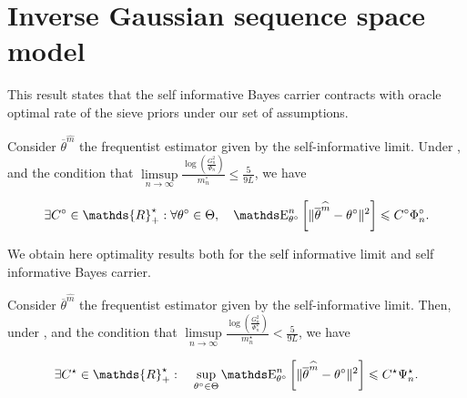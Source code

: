 \section{Inverse Gaussian sequence space model}\label{FREQ_IGSSM_KNOWN}

This result states that the self informative Bayes carrier contracts with oracle optimal rate of the sieve priors under our set of assumptions.

\begin{thm}\label{THM_FREQ_IGSSM_KNOWN_IID_ORACLE_NP}
Consider $\overline{\theta}^{\widehat{m}}$ the frequentist estimator given by the self-informative limit.
Under ,  and the condition that $\limsup\limits_{n \rightarrow \infty}\frac{\log\left(\frac{G_{n}^{2}}{\Phi_{n}^{\circ}}\right)}{m_{n}^{\circ}} \leq \frac{5}{9 L}$, we have

\[\exists C^{\circ} \in \mathds{R}_{+}^{\star} : \forall \theta^{\circ} \in \Theta, \quad \E_{\theta^{\circ}}^{n}\left[\Vert \overline{\theta}^{\widehat{m}} - \theta^{\circ} \Vert^{2}\right] \leq C^{\circ} \Phi_{n}^{\circ}.\]
\end{thm}

We obtain here optimality results both for the self informative limit and self informative Bayes carrier.

\begin{thm}\label{THM_FREQ_IGSSM_KNOWN_IID_MINIMAX_NP}
Consider $\overline{\theta}^{\widehat{m}}$ the frequentist estimator given by the self-informative limit.
Then, under ,  and the condition that $\limsup\limits_{n \rightarrow \infty}\frac{\log\left(\frac{G_{n}^{2}}{\Phi_{n}^{\star}}\right)}{m_{n}^{\star}} < \frac{5}{9 L}$, we have

\[\exists C^{\star} \in \mathds{R}_{+}^{\star} : \quad \sup\limits_{\theta^{\circ}\in \Theta}\E_{\theta^{\circ}}^{n}\left[\Vert \overline{\theta}^{\widehat{m}} - \theta^{\circ} \Vert^{2}\right] \leq C^{\star} \Psi_{n}^{\star}.\]
\end{thm}


